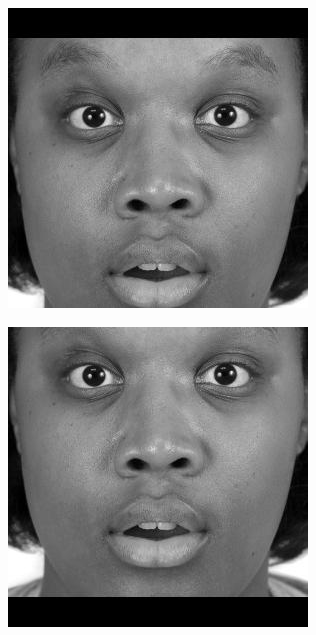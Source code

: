 \begin{figure}[H]
\centering
\begin{subfigure}[b]{.3\linewidth}
\includegraphics[width=\linewidth]{img/tests/shifts/shifted_image0.jpg}
\end{subfigure}
\centering
\begin{subfigure}[b]{.3\linewidth}
\includegraphics[width=\linewidth]{img/tests/shifts/shifted_image1.jpg}
\end{subfigure}



\end{figure}
